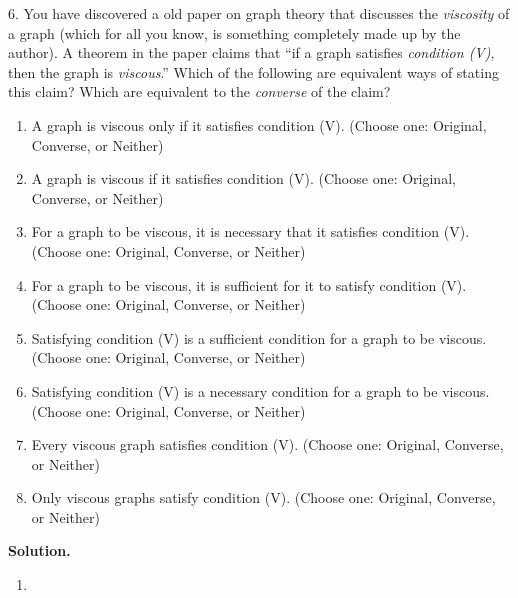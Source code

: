 \documentclass[10pt,]{book}
\theoremstyle{plain}
\theoremstyle{definition}
\theoremstyle{definition}
\numberwithin{equation}{chapter}
\begin{document}
\begin{exerciselist}
\par
\item[6.]\hypertarget{exercise-6}{}\noindent%
\hypertarget{p-221}{}%
You have discovered a old paper on graph theory that discusses the \emph{viscosity} of a graph (which for all you know, is something completely made up by the author).  A theorem in the paper claims that ``if a graph satisfies \emph{condition (V)}, then the graph is \emph{viscous}.''  Which of the following are equivalent ways of stating this claim?  Which are equivalent to the \emph{converse} of the claim?%
\par
\hypertarget{p-222}{}%
\leavevmode%
\begin{enumerate}[label=(\alph*)]
\item\hypertarget{li-111}{}\hypertarget{p-223}{}%
A graph is viscous only if it satisfies condition (V). (Choose one: Original, Converse, or Neither)%
\item\hypertarget{li-112}{}\hypertarget{p-224}{}%
A graph is viscous if it satisfies condition (V). (Choose one: Original, Converse, or Neither)%
\item\hypertarget{li-113}{}\hypertarget{p-225}{}%
For a graph to be viscous, it is necessary that it satisfies condition (V). (Choose one: Original, Converse, or Neither)%
\item\hypertarget{li-114}{}\hypertarget{p-226}{}%
For a graph to be viscous, it is sufficient for it to satisfy condition (V). (Choose one: Original, Converse, or Neither)%
\item\hypertarget{li-115}{}\hypertarget{p-227}{}%
Satisfying condition (V) is a sufficient condition for a graph to be viscous. (Choose one: Original, Converse, or Neither)%
\item\hypertarget{li-116}{}\hypertarget{p-228}{}%
Satisfying condition (V) is a necessary condition for a graph to be viscous. (Choose one: Original, Converse, or Neither)%
\item\hypertarget{li-117}{}\hypertarget{p-229}{}%
Every viscous graph satisfies condition (V). (Choose one: Original, Converse, or Neither)%
\item\hypertarget{li-118}{}\hypertarget{p-230}{}%
Only viscous graphs satisfy condition (V). (Choose one: Original, Converse, or Neither)%
\end{enumerate}
%
\par
\medskip\noindent%
\textbf{Solution.}\quad \hypertarget{p-231}{}%
\leavevmode%
\begin{enumerate}[label=(\alph*)]
\item\hypertarget{li-119}{}\hypertarget{p-232}{}%

\end{enumerate}
\end{exerciselist}
\end{document}
